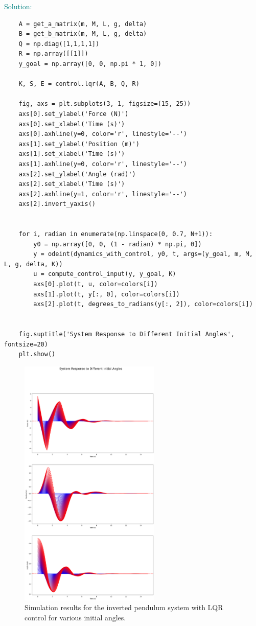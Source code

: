 \documentclass[a4 paper]{article}
\begin{document}
\medbreak

\textcolor{teal}{
    Solution:
}

\begin{verbatim}
    A = get_a_matrix(m, M, L, g, delta)
    B = get_b_matrix(m, M, L, g, delta)
    Q = np.diag([1,1,1,1])
    R = np.array([[1]])
    y_goal = np.array([0, 0, np.pi * 1, 0])

    K, S, E = control.lqr(A, B, Q, R)

    fig, axs = plt.subplots(3, 1, figsize=(15, 25))
    axs[0].set_ylabel('Force (N)')
    axs[0].set_xlabel('Time (s)')
    axs[0].axhline(y=0, color='r', linestyle='--')
    axs[1].set_ylabel('Position (m)')
    axs[1].set_xlabel('Time (s)')
    axs[1].axhline(y=0, color='r', linestyle='--')
    axs[2].set_ylabel('Angle (rad)')
    axs[2].set_xlabel('Time (s)')
    axs[2].axhline(y=1, color='r', linestyle='--')
    axs[2].invert_yaxis()


    for i, radian in enumerate(np.linspace(0, 0.7, N+1)):
        y0 = np.array([0, 0, (1 - radian) * np.pi, 0])
        y = odeint(dynamics_with_control, y0, t, args=(y_goal, m, M, L, g, delta, K))
        u = compute_control_input(y, y_goal, K)
        axs[0].plot(t, u, color=colors[i])
        axs[1].plot(t, y[:, 0], color=colors[i])
        axs[2].plot(t, degrees_to_radians(y[:, 2]), color=colors[i])


    fig.suptitle('System Response to Different Initial Angles', fontsize=20)
    plt.show()
\end{verbatim}

\begin{figure}[H]
    \centering
    \includegraphics[width=0.6\textwidth]{./figs/Different_initial_angles.png}
    \caption{Simulation results for the inverted pendulum system with LQR control for various initial angles.}
\end{figure}
\end{document}
